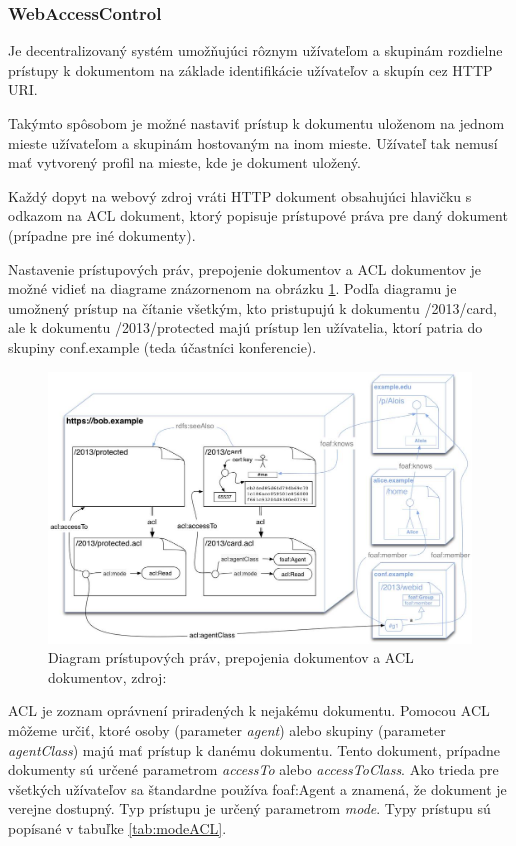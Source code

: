\documentclass[thesis=M,slovak]{FITthesis}[2013/05/06]
\begin{document}
\subsubsection{WebAccessControl}
Je decentralizovaný systém umožňujúci rôznym užívateľom a skupinám rozdielne prístupy k dokumentom na základe identifikácie užívateľov a skupín cez HTTP URI. 

Takýmto spôsobom je možné nastaviť prístup k dokumentu uloženom na jednom mieste užívateľom a skupinám hostovaným na inom mieste. Užívateľ tak nemusí mať vytvorený profil na mieste, kde je dokument uložený.

Každý dopyt na webový zdroj vráti HTTP dokument obsahujúci hlavičku s odkazom na ACL dokument, ktorý popisuje prístupové práva pre daný dokument (prípadne pre iné dokumenty).
\cite{WebAccessControl}

Nastavenie prístupových práv, prepojenie dokumentov a ACL dokumentov je možné vidieť na diagrame znázornenom na obrázku \ref{graphics:WebACL}. Podľa diagramu je umožnený prístup na čítanie všetkým, kto pristupujú k dokumentu /2013/card, ale k dokumentu /2013/protected majú prístup len užívatelia, ktorí patria do skupiny conf.example (teda účastníci konferencie).

\begin{figure}\centering
	\includegraphics[width=1.0\textwidth]{stavy/WebACL.jpg}
 	\caption[Diagram WebACL]{Diagram prístupových práv, prepojenia dokumentov a ACL dokumentov, zdroj: \cite{WebAccessControl}}\label{graphics:WebACL}
\end{figure}

ACL je zoznam oprávnení priradených k nejakému dokumentu. Pomocou ACL môžeme určiť, ktoré osoby (parameter {\em agent}) alebo skupiny (parameter {\em agentClass}) majú mať prístup k danému dokumentu. Tento dokument, prípadne dokumenty sú určené parametrom {\em accessTo} alebo {\em accessToClass}. Ako trieda pre všetkých užívateľov sa štandardne používa foaf:Agent a znamená, že dokument je verejne dostupný.
Typ prístupu je určený parametrom {\em mode}. Typy prístupu sú popísané v tabuľke \ref{tab:modeACL}.
\end{document}
